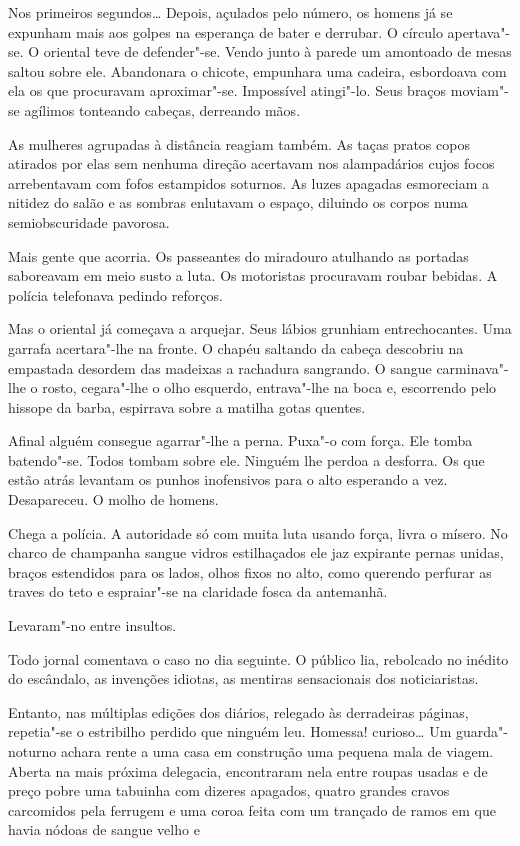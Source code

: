Nos primeiros segundos\ldots{} Depois, açulados pelo número, os homens já se
expunham mais aos golpes na esperança de bater e derrubar. O círculo
apertava"-se. O oriental teve de defender"-se. Vendo junto à parede um
amontoado de mesas saltou sobre ele. Abandonara o chicote, empunhara uma
cadeira, esbordoava com ela os que procuravam aproximar"-se. Impossível
atingi"-lo. Seus braços moviam"-se agílimos tonteando cabeças, derreando
mãos.

As mulheres agrupadas à distância reagiam também. As taças pratos copos
atirados por elas sem nenhuma direção acertavam nos alampadários cujos
focos arrebentavam com fofos estampidos soturnos. As luzes apagadas
esmoreciam a nitidez do salão e as sombras enlutavam o espaço, diluindo
os corpos numa semiobscuridade pavorosa.

Mais gente que acorria. Os passeantes do miradouro atulhando as portadas
saboreavam em meio susto a luta. Os motoristas procuravam roubar
bebidas. A polícia telefonava pedindo reforços.

Mas o oriental já começava a arquejar. Seus lábios grunhiam
entrechocantes. Uma garrafa acertara"-lhe na fronte. O chapéu saltando da
cabeça descobriu na empastada desordem das madeixas a rachadura
sangrando. O sangue carminava"-lhe o rosto, cegara"-lhe o olho esquerdo,
entrava"-lhe na boca e, escorrendo pelo hissope da barba, espirrava sobre
a matilha gotas quentes.

Afinal alguém consegue agarrar"-lhe a perna. Puxa"-o com força. Ele tomba
batendo"-se. Todos tombam sobre ele. Ninguém lhe perdoa a desforra. Os
que estão atrás levantam os punhos inofensivos para o alto esperando a
vez. Desapareceu. O molho de homens.

Chega a polícia. A autoridade só com muita luta usando força, livra o
mísero. No charco de champanha sangue vidros estilhaçados ele jaz
expirante pernas unidas, braços estendidos para os lados, olhos fixos no
alto, como querendo perfurar as traves do teto e espraiar"-se na
claridade fosca da antemanhã.

Levaram"-no entre insultos.

\asterisc

Todo jornal comentava o caso no dia seguinte. O público lia, rebolcado
no inédito do escândalo, as invenções idiotas, as mentiras sensacionais
dos noticiaristas.

Entanto, nas múltiplas edições dos diários, relegado às derradeiras
páginas, repetia"-se o estribilho perdido que ninguém leu. Homessa!
curioso\ldots{} Um guarda"-noturno achara rente a uma casa em construção uma
pequena mala de viagem. Aberta na mais próxima delegacia, encontraram
nela entre roupas usadas e de preço pobre uma tabuinha com dizeres
apagados, quatro grandes cravos carcomidos pela ferrugem e uma coroa
feita com um trançado de ramos em que havia nódoas de sangue velho e



